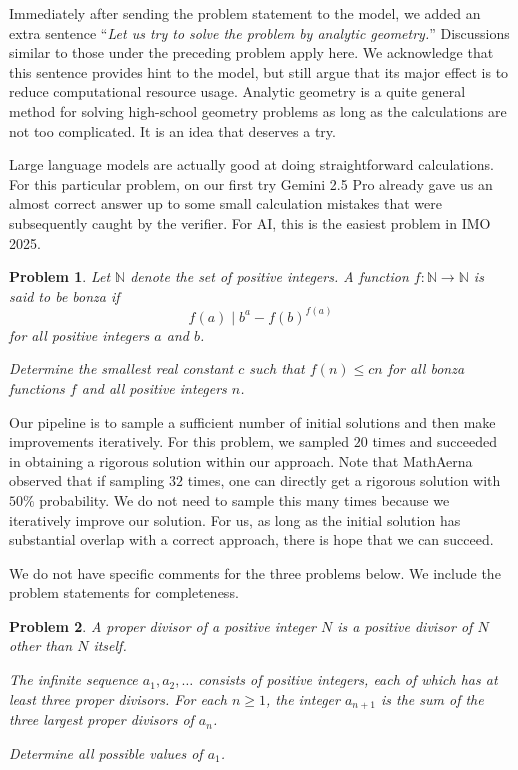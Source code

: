 \documentclass[12pt]{article}
\newtheorem{problem}{Problem}
\begin{document}
Immediately after sending the problem statement to the model, we added an extra sentence ``\emph{Let us try to solve the problem by analytic geometry.}'' Discussions similar to those under the preceding problem apply here. We acknowledge that this sentence provides hint to the model, but still argue that its major effect is to reduce computational resource usage. Analytic geometry is a quite general method for solving high-school geometry problems as long as the calculations are not too complicated. It is an idea that deserves a try.

Large language models are actually good at doing straightforward calculations. For this particular problem, on our first try Gemini 2.5 Pro already gave us an almost correct answer up to some small calculation mistakes that were subsequently caught by the verifier. For AI, this is the easiest problem in IMO 2025.

\begin{problem}
Let $\mathbb{N}$ denote the set of positive integers. A function $f : \mathbb{N} \to \mathbb{N}$ is said to be \textit{bonza} if
\[
f(a) \mid b^a - f(b)^{f(a)}
\]
for all positive integers $a$ and $b$.

Determine the smallest real constant $c$ such that $f(n) \le cn$ for all bonza functions $f$ and all positive integers $n$.
\end{problem}

Our pipeline is to sample a sufficient number of initial solutions and then make improvements iteratively. For this problem, we sampled $20$ times and succeeded in obtaining a rigorous solution within our approach. Note that MathAerna \cite{matharena2025} observed that if sampling $32$ times, one can directly get a rigorous solution with $50\%$ probability. We do not need to sample this many times because we iteratively improve our solution. For us, as long as the initial solution has substantial overlap with a correct approach, there is hope that we can succeed.

We do not have specific comments for the three problems below. We include the problem statements for completeness.

\begin{problem}
A proper divisor of a positive integer $N$ is a positive divisor of $N$ other than $N$ itself.

The infinite sequence $a_1, a_2, \ldots$ consists of positive integers, each of which has at least three proper divisors. For each $n \ge 1$, the integer $a_{n+1}$ is the sum of the three largest proper divisors of $a_n$.

Determine all possible values of $a_1$.
\end{problem}
\end{document}
